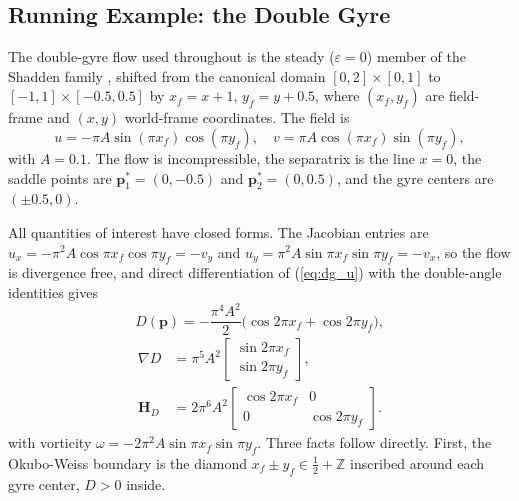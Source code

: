 \documentclass[lettersize,journal]{IEEEtran}
\begin{document}
\subsection{Running Example: the Double Gyre}
\label{sec:dg_example}

The double-gyre flow used throughout is the steady ($\varepsilon = 0$)
member of the Shadden family \cite{8}, shifted from the canonical domain
$[0,2] \times [0,1]$ to $[-1,1] \times [-0.5, 0.5]$ by
$x_f = x + 1$, $y_f = y + 0.5$, where $(x_f, y_f)$ are field-frame and
$(x, y)$ world-frame coordinates. The field is
\begin{equation}
    u = -\pi A \sin(\pi x_f) \cos(\pi y_f), \quad
    v = \pi A \cos(\pi x_f) \sin(\pi y_f),
    \label{eq:dg_u}
\end{equation}
with $A = 0.1$. The flow is incompressible, the separatrix is the line
$x = 0$, the saddle points are $\mathbf{p}^*_1 = (0, -0.5)$ and
$\mathbf{p}^*_2 = (0, 0.5)$, and the gyre centers are $(\pm 0.5, 0)$.

All quantities of interest have closed forms. The Jacobian entries are
$u_x = -\pi^2 A \cos\pi x_f \cos\pi y_f = -v_y$ and
$u_y = \pi^2 A \sin\pi x_f \sin\pi y_f = -v_x$, so the flow is divergence
free, and direct differentiation of (\ref{eq:dg_u}) with the double-angle
identities gives
\begin{equation}
    D(\mathbf{p}) = -\frac{\pi^4 A^2}{2}
    \bigl(\cos 2\pi x_f + \cos 2\pi y_f\bigr),
    \label{eq:det_analytic_main}
\end{equation}
\begin{equation}
    \begin{aligned}
    \nabla D &= \pi^5 A^2
    \begin{bmatrix} \sin 2\pi x_f \\ \sin 2\pi y_f \end{bmatrix},
    \\
    \mathbf{H}_D &= 2\pi^6 A^2
    \begin{bmatrix} \cos 2\pi x_f & 0 \\ 0 & \cos 2\pi y_f \end{bmatrix}.
    \end{aligned}
    \label{eq:gradhess_analytic_main}
\end{equation}
with vorticity $\omega = -2\pi^2 A \sin\pi x_f \sin\pi y_f$. Three facts
follow directly. First, the Okubo-Weiss boundary is the diamond
$x_f \pm y_f \in \tfrac{1}{2} + \mathbb{Z}$ inscribed around each gyre
center, $D > 0$ inside.
\end{document}
